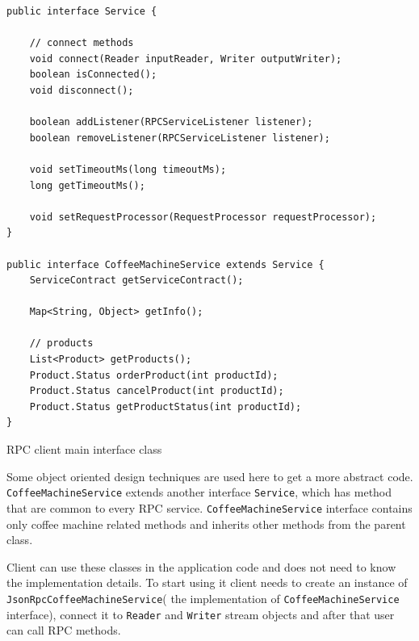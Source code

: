 \begin{listing}[H]
\begin{verbatim}
public interface Service {

    // connect methods
    void connect(Reader inputReader, Writer outputWriter);
    boolean isConnected();
    void disconnect();

    boolean addListener(RPCServiceListener listener);
    boolean removeListener(RPCServiceListener listener);

    void setTimeoutMs(long timeoutMs);
    long getTimeoutMs();

    void setRequestProcessor(RequestProcessor requestProcessor);
}               
               
public interface CoffeeMachineService extends Service {
    ServiceContract getServiceContract();
    
    Map<String, Object> getInfo();
    
    // products
    List<Product> getProducts();
    Product.Status orderProduct(int productId);
    Product.Status cancelProduct(int productId);
    Product.Status getProductStatus(int productId);
}
\end{verbatim}
\caption{RPC client main interface class}
\label{lst:rpc_client_interface_class}
\end{listing}

Some object oriented design techniques are used here to get a more abstract code. 
\texttt{CoffeeMachineService}  extends another
interface \texttt{Service}, which has method that are common to every RPC
service.
\texttt{CoffeeMachineService} interface contains only coffee machine related methods and
inherits other methods from the parent class.

Client can use these classes in the application code and does not need to know
the implementation details. To start using it client needs to create an instance
of \texttt{JsonRpcCoffeeMachineService}( the implementation of \texttt{CoffeeMachineService} interface), connect it to \texttt{Reader} and
\texttt{Writer} stream objects and after that  user can call RPC methods.

